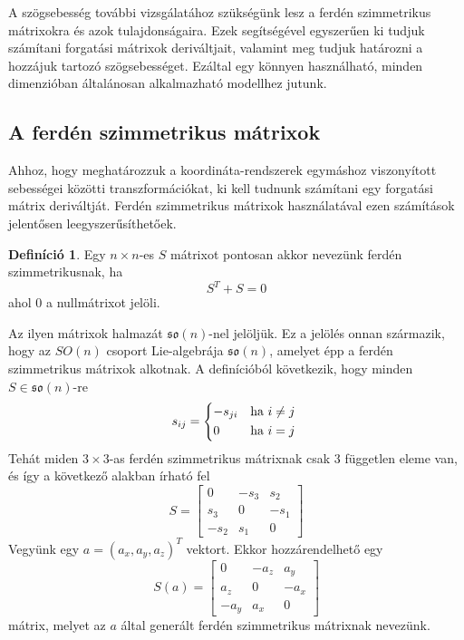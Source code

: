 \documentclass[12pt,a4paper]{report}
\theoremstyle{remark}
\theoremstyle{definition}
\newtheorem{defi}{Definíció}[section]
\begin{document}
A szögsebesség további vizsgálatához szükségünk lesz a ferdén szimmetrikus mátrixokra és azok tulajdonságaira. 
Ezek segítségével egyszerűen ki tudjuk számítani forgatási mátrixok deriváltjait, valamint meg tudjuk határozni a 
hozzájuk tartozó szögsebességet. Ezáltal egy könnyen használható, minden dimenzióban általánosan alkalmazható 
modellhez jutunk.

\subsection{A ferdén szimmetrikus mátrixok}
Ahhoz, hogy meghatározzuk a koordináta-rendszerek egymáshoz viszonyított sebességei közötti transzformációkat, ki 
kell tudnunk számítani egy forgatási mátrix deriváltját. Ferdén szimmetrikus mátrixok használatával ezen számítások 
jelentősen leegyszerűsíthetőek.
\begin{defi}
Egy $n \times n$-es $S$ mátrixot pontosan akkor nevezünk ferdén szimmetrikusnak, ha
\begin{equation}
S^T + S = 0
\end{equation}
ahol $0$ a nullmátrixot jelöli.
\end{defi}
Az ilyen mátrixok halmazát $\mathfrak{so}(n)$-nel jelöljük. Ez a jelölés onnan származik, hogy az $SO(n)$ csoport 
Lie-algebrája $\mathfrak{so}(n)$, amelyet épp a ferdén szimmetrikus mátrixok alkotnak. A definícióból következik, 
hogy minden 
$S \in \mathfrak{so}(n)$-re 
\begin{equation}
s_{ij} = \begin{dcases*}
    -s_{ji} & ha $i \neq j$\\
    0 & ha $i = j$
    \end{dcases*}
\end{equation}
Tehát miden $3 \times 3$-as ferdén szimmetrikus mátrixnak csak $3$ független eleme van, és így a következő alakban 
írható fel
\begin{equation}
S = \begin{bmatrix}
    0 & -s_3 & s_2 \\ 
    s_3 & 0 & -s_1 \\ 
    -s_2 & s_1 & 0
    \end{bmatrix} 
\end{equation}
Vegyünk egy $a = (a_x, a_y, a_z)^T$ vektort. Ekkor hozzárendelhető egy
\begin{equation} \label{eq:generatedskew}
S(a) = \begin{bmatrix}
    0 & -a_z & a_y \\ 
    a_z & 0 & -a_x \\ 
    -a_y & a_x & 0
    \end{bmatrix} 
\end{equation}
mátrix, melyet az $a$ által generált ferdén szimmetrikus mátrixnak nevezünk.
\end{document}
